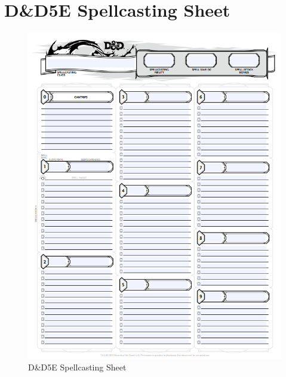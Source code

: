 \documentclass{article}
\begin{document}
\section{D\&D5E Spellcasting Sheet}
\begin{figure}
	\centering
	\includegraphics{spell-sheet}
	\caption{D\&D5E Spellcasting Sheet}
	\label{fig:appb}
\end{figure}
\end{document}
